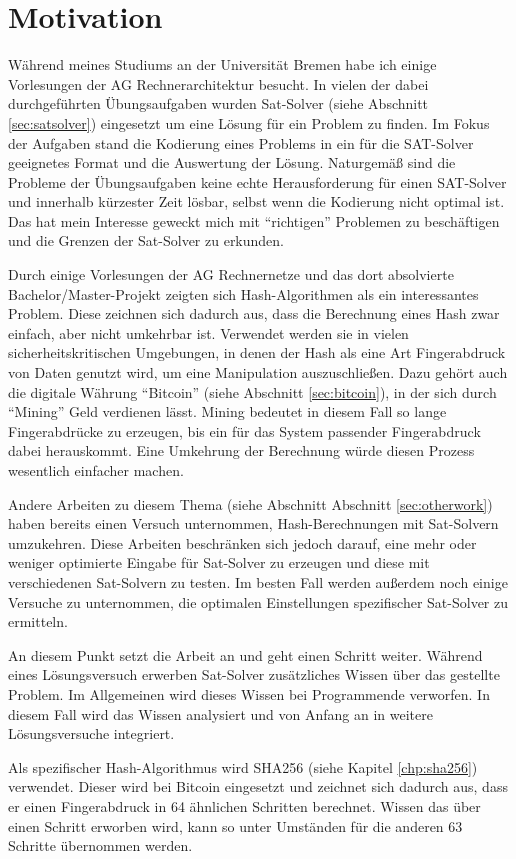 \section{Motivation}

Während meines Studiums an der Universität Bremen habe ich einige Vorlesungen der AG Rechnerarchitektur besucht.
In vielen der dabei durchgeführten Übungsaufgaben wurden Sat-Solver (siehe Abschnitt \ref{sec:satsolver}) eingesetzt
um eine Lösung für ein Problem zu finden. Im Fokus der Aufgaben stand die Kodierung eines Problems in ein für die
SAT-Solver geeignetes Format und die Auswertung der Lösung. Naturgemäß sind die Probleme der Übungsaufgaben keine
echte Herausforderung für einen SAT-Solver und innerhalb kürzester Zeit lösbar, selbst wenn die Kodierung nicht optimal
ist. Das hat mein Interesse geweckt mich mit "`richtigen"' Problemen zu beschäftigen und die Grenzen der Sat-Solver
zu erkunden.

Durch einige Vorlesungen der AG Rechnernetze und das dort absolvierte Bachelor/Master-Projekt zeigten sich Hash-Algorithmen
als ein interessantes Problem. Diese zeichnen sich dadurch aus, dass die Berechnung eines Hash zwar einfach, aber nicht
umkehrbar ist. Verwendet werden sie in vielen sicherheitskritischen Umgebungen, in denen der Hash als eine Art Fingerabdruck
von Daten genutzt wird, um eine Manipulation auszuschließen. Dazu gehört auch die digitale Währung "`Bitcoin"' (siehe Abschnitt
\ref{sec:bitcoin}), in der sich durch "`Mining"' Geld verdienen lässt. Mining bedeutet in diesem Fall so lange Fingerabdrücke
zu erzeugen, bis ein für das System passender Fingerabdruck dabei herauskommt. Eine Umkehrung der Berechnung würde diesen
Prozess wesentlich einfacher machen.

Andere Arbeiten zu diesem Thema (siehe Abschnitt Abschnitt \ref{sec:otherwork}) haben bereits einen Versuch unternommen,
Hash-Berechnungen mit Sat-Solvern umzukehren. Diese Arbeiten beschränken sich jedoch darauf, eine mehr oder weniger optimierte
Eingabe für Sat-Solver zu erzeugen und diese mit verschiedenen Sat-Solvern zu testen. Im besten Fall werden außerdem noch
einige Versuche zu unternommen, die optimalen Einstellungen spezifischer Sat-Solver zu ermitteln.

An diesem Punkt setzt die Arbeit an und geht einen Schritt weiter. Während eines Lösungsversuch erwerben Sat-Solver zusätzliches
Wissen über das gestellte Problem. Im Allgemeinen wird dieses Wissen bei Programmende verworfen. In diesem Fall wird das Wissen
analysiert und von Anfang an in weitere Lösungsversuche integriert.

Als spezifischer Hash-Algorithmus wird SHA256 (siehe Kapitel \ref{chp:sha256}) verwendet. Dieser wird bei Bitcoin eingesetzt und
zeichnet sich dadurch aus, dass er einen Fingerabdruck in 64 ähnlichen Schritten berechnet. Wissen das über einen Schritt
erworben wird, kann so unter Umständen für die anderen 63 Schritte übernommen werden.
